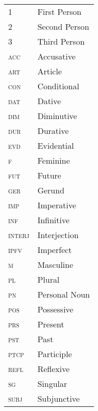 \documentclass[output=paper]{langsci/langscibook}
\begin{document}
\begin{tabularx}{.45\textwidth}{lQ}
1 & First Person\\ 
2 & Second Person\\ 
3 & Third Person\\ 
\textsc{acc} & Accusative\\ 
\textsc{art} & Article\\ 
\textsc{con} & Conditional\\ 
\textsc{dat} & Dative\\
\textsc{dim} & Diminutive\\ 
\textsc{dur} & Durative\\ 
\textsc{evd} & Evidential\\ 
\textsc{f} & Feminine\\ 
\textsc{fut} & Future\\ 
\textsc{ger} & Gerund\\ 
\textsc{imp} & Imperative\\ 
\textsc{inf} & Infinitive\\ 
\textsc{interj} & Interjection\\ 
\textsc{ipfv} & Imperfect\\ 
\textsc{m} & Masculine\\ 
\textsc{pl} & Plural\\ 
\textsc{pn} & Personal Noun\\ 
\textsc{pos} & Possessive\\ 
\textsc{prs} & Present\\ 
\textsc{pst} & Past\\ 
\textsc{ptcp} & Participle\\ 
\textsc{refl} & Reflexive\\ 
\textsc{sg} & Singular\\ 
\textsc{subj} & Subjunctive\\ 
\end{tabularx}
%

\sloppy
\printbibliography[heading=subbibliography,notkeyword=this] 
\end{document}

